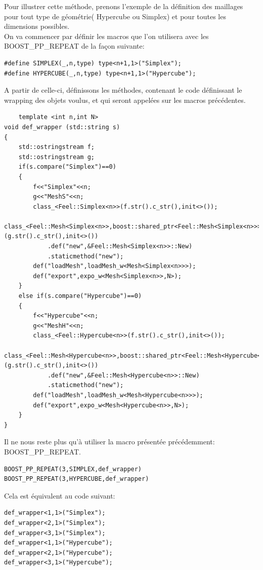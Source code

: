 \documentclass[french,12pt]{article}
\begin{document}
Pour illustrer cette méthode, prenons l'exemple de la définition des maillages pour tout type de géométrie( Hypercube ou Simplex) et pour toutes les dimensions possibles.\\

On va commencer par définir les macros que l'on utilisera avec les BOOST\_PP\_REPEAT de la façon suivante:
\begin{lstlisting}
#define SIMPLEX(_,n,type) type<n+1,1>("Simplex");
#define HYPERCUBE(_,n,type) type<n+1,1>("Hypercube");
\end{lstlisting}

A partir de celle-ci, définissons les méthodes, contenant le code définissant le wrapping des objets voulus, et qui seront appelées sur les macros précédentes.
\begin{lstlisting}
    template <int n,int N>
void def_wrapper (std::string s)
{    
    std::ostringstream f;
    std::ostringstream g;
    if(s.compare("Simplex")==0)
    {
        f<<"Simplex"<<n;
        g<<"MeshS"<<n;
        class_<Feel::Simplex<n>>(f.str().c_str(),init<>());
        class_<Feel::Mesh<Simplex<n>>,boost::shared_ptr<Feel::Mesh<Simplex<n>>>,boost::noncopyable>(g.str().c_str(),init<>())
            .def("new",&Feel::Mesh<Simplex<n>>::New)
            .staticmethod("new");
        def("loadMesh",loadMesh_w<Mesh<Simplex<n>>>);
        def("export",expo_w<Mesh<Simplex<n>>,N>);
    }
    else if(s.compare("Hypercube")==0)
    {
        f<<"Hypercube"<<n;
        g<<"MeshH"<<n;   
        class_<Feel::Hypercube<n>>(f.str().c_str(),init<>());
        class_<Feel::Mesh<Hypercube<n>>,boost::shared_ptr<Feel::Mesh<Hypercube<n>>>,boost::noncopyable>(g.str().c_str(),init<>())
            .def("new",&Feel::Mesh<Hypercube<n>>::New)
            .staticmethod("new");
        def("loadMesh",loadMesh_w<Mesh<Hypercube<n>>>);
        def("export",expo_w<Mesh<Hypercube<n>>,N>);
    }
}
\end{lstlisting}

Il ne nous reste plus qu'à utiliser la macro présentée précédemment: BOOST\_PP\_REPEAT.
\begin{lstlisting}
BOOST_PP_REPEAT(3,SIMPLEX,def_wrapper)
BOOST_PP_REPEAT(3,HYPERCUBE,def_wrapper)
\end{lstlisting}

Cela est équivalent au code suivant:
\begin{lstlisting}
def_wrapper<1,1>("Simplex");
def_wrapper<2,1>("Simplex");
def_wrapper<3,1>("Simplex");
def_wrapper<1,1>("Hypercube");
def_wrapper<2,1>("Hypercube");
def_wrapper<3,1>("Hypercube");
\end{lstlisting}
\end{document}
